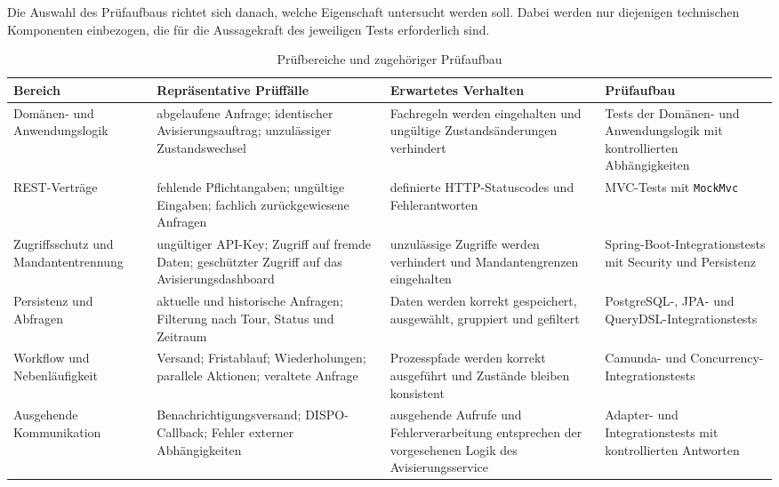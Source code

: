 \documentclass[
  12pt,
  a4paper,
  oneside
]{article}
\begin{document}
Die Auswahl des Prüfaufbaus richtet sich danach, welche Eigenschaft untersucht
werden soll. Dabei werden nur diejenigen technischen Komponenten einbezogen,
die für die Aussagekraft des jeweiligen Tests erforderlich sind.

\begin{table}[htbp]
  \centering
  \footnotesize
  \setlength{\tabcolsep}{3pt}
  \renewcommand{\arraystretch}{1.15}
  \caption{Prüfbereiche und zugehöriger Prüfaufbau}
  \label{tab:backend-pruefbereiche}
  \begin{tabularx}{\textwidth}{@{}
    >{\raggedright\arraybackslash}p{}
    >{\raggedright\arraybackslash}p{}
    >{\raggedright\arraybackslash}p{}
    >{\raggedright\arraybackslash}X@{}}
    \toprule
    \textbf{Bereich}
      & \textbf{Repräsentative Prüffälle}
      & \textbf{Erwartetes Verhalten}
      & \textbf{Prüfaufbau} \\
    \midrule
    Domänen- und Anwendungslogik
      & abgelaufene Anfrage; identischer Avisierungsauftrag; unzulässiger
        Zustandswechsel
      & Fachregeln werden eingehalten und ungültige Zustandsänderungen verhindert
      & Tests der Domänen- und Anwendungslogik mit kontrollierten Abhängigkeiten \\
    REST-Verträge
      & fehlende Pflichtangaben; ungültige Eingaben; fachlich zurückgewiesene Anfragen
      & definierte HTTP-Statuscodes und Fehlerantworten
      & MVC-Tests mit \texttt{MockMvc} \\
    Zugriffsschutz und Mandantentrennung
      & ungültiger API-Key; Zugriff auf fremde Daten; geschützter Zugriff auf das
        Avisierungsdashboard
      & unzulässige Zugriffe werden verhindert und Mandantengrenzen eingehalten
      & Spring-Boot-Integrationstests mit Security und Persistenz \\
    Persistenz und Abfragen
      & aktuelle und historische Anfragen; Filterung nach Tour, Status und Zeitraum
      & Daten werden korrekt gespeichert, ausgewählt, gruppiert und gefiltert
      & PostgreSQL-, JPA- und QueryDSL-Integrationstests \\
    Workflow und Nebenläufigkeit
      & Versand; Fristablauf; Wiederholungen; parallele Aktionen; veraltete Anfrage
      & Prozesspfade werden korrekt ausgeführt und Zustände bleiben konsistent
      & Camunda- und Concurrency-Integrationstests \\
    Ausgehende Kommunikation
      & Benachrichtigungsversand; DISPO-Callback; Fehler externer Abhängigkeiten
      & ausgehende Aufrufe und Fehlerverarbeitung entsprechen der vorgesehenen
        Logik des Avisierungsservice
      & Adapter- und Integrationstests mit kontrollierten Antworten \\
    \bottomrule
  \end{tabularx}
\end{table}
\end{document}
